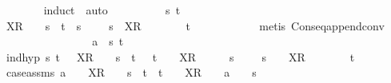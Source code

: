\begin{isabellebody}
\ \ \ \ \ \ \isamarkupfalse%
\ {\isacharparenleft}induct\ {\isasymrho}{\isacharcomma}\ auto{\isacharparenright}\isanewline
\ \ \ \ \ \ \ \ \isamarkupfalse%
\ s\ t\isanewline
\ \ \ \ \ \ \ \ \isamarkupfalse%
\ {\isachardoublequoteopen}{\isacharbrackleft}X{\isacharbrackright}\isactrlsub R\ {\isacharhash}\ {\isasymsigma}\ {\isacharequal}\ s\ {\isacharat}\ t\ {\isasymLongrightarrow}\ s\ {\isasymnoteq}\ {\isacharbrackleft}{\isacharbrackright}\ {\isasymLongrightarrow}\ {\isasymexists}{\isasymsigma}{\isacharprime}{\isachardot}\ s\ {\isacharequal}\ {\isacharbrackleft}X{\isacharbrackright}\isactrlsub R\ {\isacharhash}\ {\isasymsigma}{\isacharprime}\ {\isasymand}\ {\isasymsigma}\ {\isacharequal}\ {\isasymsigma}{\isacharprime}\ {\isacharat}\ t{\isachardoublequoteclose}\isanewline
\ \ \ \ \ \ \ \ \ \ \isamarkupfalse%
\ {\isacharparenleft}metis\ Cons{\isacharunderscore}eq{\isacharunderscore}append{\isacharunderscore}conv{\isacharparenright}\isanewline
\ \ \ \ \ \ \isamarkupfalse%
\isanewline
\ \ \ \ \ \ \ \ \isamarkupfalse%
\ a\ {\isasymrho}\ s\ t\isanewline
\ \ \ \ \ \ \ \ \isamarkupfalse%
\ ind{\isacharunderscore}hyp{\isacharcolon}\ {\isachardoublequoteopen}{\isasymAnd}s\ t{\isachardot}\ {\isasymrho}\ {\isacharat}\ {\isacharbrackleft}X{\isacharbrackright}\isactrlsub R\ {\isacharhash}\ {\isasymsigma}\ {\isacharequal}\ s\ {\isacharat}\ t\ {\isasymLongrightarrow}\ {\isasymforall}{\isasymrho}{\isacharprime}{\isachardot}\ t\ {\isacharequal}\ {\isasymrho}{\isacharprime}\ {\isacharat}\ {\isacharbrackleft}X{\isacharbrackright}\isactrlsub R\ {\isacharhash}\ {\isasymsigma}\ {\isasymlongrightarrow}\ {\isasymrho}\ {\isasymnoteq}\ s\ {\isacharat}\ {\isasymrho}{\isacharprime}\ {\isasymLongrightarrow}\ {\isasymexists}{\isasymsigma}{\isacharprime}{\isachardot}\ s\ {\isacharequal}\ {\isasymrho}\ {\isacharat}\ {\isacharbrackleft}X{\isacharbrackright}\isactrlsub R\ {\isacharhash}\ {\isasymsigma}{\isacharprime}\ {\isasymand}\ {\isasymsigma}\ {\isacharequal}\ {\isasymsigma}{\isacharprime}\ {\isacharat}\ t{\isachardoublequoteclose}\isanewline
\ \ \ \ \ \ \ \ \isamarkupfalse%
\ case{\isacharunderscore}assms{}{\isacharcolon}\ {\isachardoublequoteopen}a\ {\isacharhash}\ {\isasymrho}\ {\isacharat}\ {\isacharbrackleft}X{\isacharbrackright}\isactrlsub R\ {\isacharhash}\ {\isasymsigma}\ {\isacharequal}\ s\ {\isacharat}\ t{\isachardoublequoteclose}\ {\isachardoublequoteopen}{\isasymforall}{\isasymrho}{\isacharprime}{\isachardot}\ t\ {\isacharequal}\ {\isasymrho}{\isacharprime}\ {\isacharat}\ {\isacharbrackleft}X{\isacharbrackright}\isactrlsub R\ {\isacharhash}\ {\isasymsigma}\ {\isasymlongrightarrow}\ a\ {\isacharhash}\ {\isasymrho}\ {\isasymnoteq}\ s\ {\isacharat}\ {\isasymrho}{\isacharprime}{\isachardoublequoteclose}\isanewline

\end{isabellebody}

